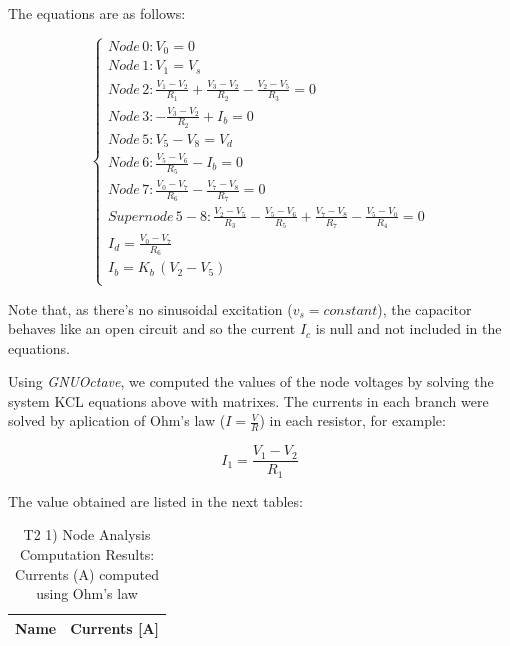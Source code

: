 The equations are as follows:

\begin{equation} 
\begin{cases}

    Node\, 0: V_0 = 0 \\
    Node\, 1: V_1 = V_s \\
    Node\, 2: \frac{V_1 - V_2}{R_1} + \frac{V_3 - V_2}{R_2} - \frac{V_2 - V_5}{R_3} = 0 \\
    Node\, 3: -\frac{V_3 - V_2}{R_2} + I_b = 0 \\
    Node\, 5: V_5 - V_8 = V_d \\
    Node\, 6: \frac{V_5 - V_6}{R_5} - I_b = 0 \\
    Node\, 7: \frac{V_0 - V_7}{R_6} - \frac{V_7 - V_8}{R_7} = 0 \\
    Supernode\, 5-8: \frac{V_2 - V_5}{R_3} - \frac{V_5 - V_6}{R_5} + \frac{V_7 - V_8}{R_7} - \frac{V_5 - V_0}{R_4} = 0 \\
    I_d = \frac{V_0 - V_7}{R_6} \\
    I_b = K_b\,(V_2 - V_5) \\
    
\end{cases}
\label{eq:1}
\end{equation}


Note that, as there's no sinusoidal excitation ($v_s = constant$), the capacitor behaves like an open circuit and so the current $I_c$ is null and not included in the equations.


Using \textit{GNUOctave}, we computed the values of the node voltages by solving the system KCL equations above with matrixes. The currents in each branch were solved by aplication of Ohm's law ($I = \frac{V}{R}$) in each resistor, for example:

\begin{center}
  \begin{equation}
    I_1 = \frac{V_1 - V_2}{R_1}
  \end{equation} 
\end{center}


The value obtained are listed in the next tables:

\begin{table}[ht]
  \centering
  \begin{tabular}{|l|r|}
    \hline    
    {\bf Name} & {\bf Currents [A]} \\ \hline
    
  \end{tabular}
  \caption{T2 1) Node Analysis Computation Results: Currents (A) computed using Ohm's law}
  \label{tab:nodeCurrents1}
\end{table}



